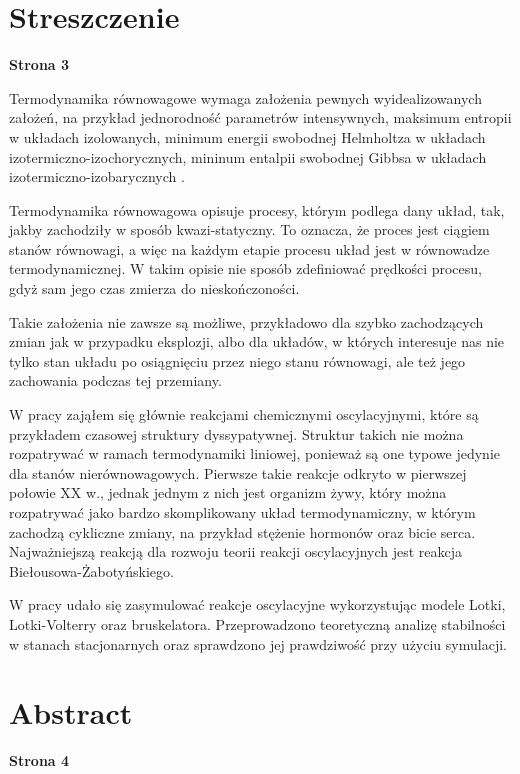 \documentclass[10pt, a4paper, twoside, onecolumn]{article}
\numberwithin{equation}{section}
\begin{document}
	\section*{Streszczenie}
	\begin{center}
		\textbf{Strona 3}
	\end{center}
	Termodynamika równowagowe wymaga założenia pewnych wyidealizowanych założeń, na przykład jednorodność parametrów intensywnych, maksimum entropii w układach izolowanych, minimum energii swobodnej Helmholtza w układach izotermiczno-izochorycznych, mininum entalpii swobodnej Gibbsa w układach izotermiczno-izobarycznych \cite{pudlik}. \par
	Termodynamika równowagowa opisuje procesy, którym podlega dany układ, tak, jakby zachodziły w sposób kwazi-statyczny. To oznacza, że proces jest ciągiem stanów równowagi, a więc na każdym etapie procesu układ jest w równowadze termodynamicznej. W takim opisie nie sposób zdefiniować prędkości procesu, gdyż sam jego czas zmierza do nieskończoności. \par
	
	 
	
	Takie założenia nie zawsze są możliwe, przykładowo dla szybko zachodzących zmian jak w przypadku eksplozji, albo dla układów, w których interesuje nas nie tylko stan układu po osiągnięciu przez niego stanu równowagi, ale też jego zachowania podczas tej przemiany. \par
	W pracy zająłem się głównie reakcjami chemicznymi oscylacyjnymi, które są przykładem czasowej struktury dyssypatywnej. Struktur takich nie można rozpatrywać w ramach termodynamiki liniowej, ponieważ są one typowe jedynie dla stanów nierównowagowych. Pierwsze takie reakcje odkryto w pierwszej połowie XX w., jednak jednym z nich jest organizm żywy, który można rozpatrywać jako bardzo skomplikowany układ termodynamiczny, w którym zachodzą cykliczne zmiany, na przykład stężenie hormonów oraz bicie serca. Najważniejszą reakcją dla rozwoju teorii reakcji oscylacyjnych jest reakcja Biełousowa-Żabotyńskiego. \par
	W pracy udało się zasymulować reakcje oscylacyjne wykorzystując modele Lotki, Lotki-Volterry oraz bruskelatora. Przeprowadzono teoretyczną analizę stabilności w stanach stacjonarnych oraz sprawdzono jej prawdziwość przy użyciu symulacji. 
	\pagebreak
	
	\section*{Abstract}
	\begin{center}
		\textbf{Strona 4}
	\end{center}
	\pagebreak
	
\end{document}

